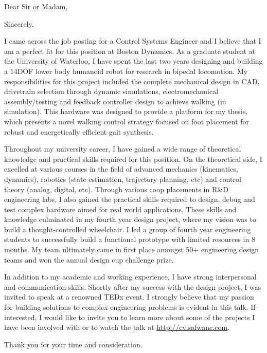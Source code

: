 \documentclass[11pt,letterpaper,sans]{moderncv}
\begin{document}
\date{September 29, 2012}
\opening{Dear Sir or Madam,}
\closing{Sincerely,}
\makelettertitle

I came across the job posting for a Control Systems Engineer and I believe that I am a perfect fit for this position at Boston Dynamics. As a graduate student at the University of Waterloo, I have spent the last two years designing and building a 14DOF lower body humanoid robot for research in bipedal locomotion. My responsibilities for this project included the complete mechanical design in CAD, drivetrain selection through dynamic simulations, electromechanical assembly/testing and feedback controller design to achieve walking (in simulation). This hardware was designed to provide a platform for my thesis, which presents a novel walking control strategy focused on foot placement for robust and energetically efficient gait synthesis. 

Throughout my university career, I have gained a wide range of theoretical knowledge and practical skills required for this position. On the theoretical side, I excelled at various courses in the field of advanced mechanics (kinematics, dynamics), robotics (state estimation, trajectory planning, etc) and control theory (analog, digital, etc). Through various coop placements in R\&D engineering labs, I also gained the practical skills required to design, debug and test complex hardware aimed for real world applications. These skills and knowledge culminated in my fourth year design project, where my vision was to build a thought-controlled wheelchair. I led a group of fourth year engineering students to successfully build a functional prototype with limited resources in 8 months. My team ultimately came in first place amongst 50+ engineering design teams and won the annual design cup challenge prize.

In addition to my academic and working experience, I have strong interpersonal and communication skills. Shortly after my success with the design project, I was invited to speak at a renowned TEDx event. I strongly believe that my passion for building solutions to complex engineering problems is evident in this talk. If interested, I would like to invite you to learn more about some of the projects I have been involved with or to watch the talk at \href{http://cv.safwanc.com}{http://cv.safwanc.com}. 

Thank you for your time and consideration.

\makeletterclosing
\end{document}
